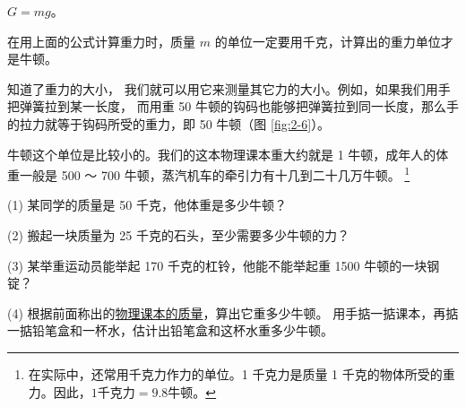 \centerline{$G = mg$。}

在用上面的公式计算重力时，质量 $m$ 的单位一定要用千克，计算出的重力单位才是牛顿。

知道了重力的大小， 我们就可以用它来测量其它力的大小。例如，如果我们用手把弹簧拉到某一长度，
而用重 50 牛顿的钩码也能够把弹簧拉到同一长度，那么手的拉力就等于钩码所受的重力，即 50 牛顿（图 \ref{fig:2-6}）。

牛顿这个单位是比较小的。我们的这本物理课本重大约就是 1 牛顿，成年人的体重一般是 500 ～ 700 牛顿，蒸汽机车的牵引力有十几到二十几万牛顿。
\footnote{在实际中，还常用千克力作力的单位。1 千克力是质量 1 千克的物体所受的重力。因此，$1 \text{千克力} =  9.8 \text{牛顿}$。}

\lianxi

(1) 某同学的质量是 50 千克，他体重是多少牛顿？

(2) 搬起一块质量为 25 千克的石头，至少需要多少牛顿的力？

(3) 某举重运动员能举起 170 千克的杠铃，他能不能举起重 1500 牛顿的一块钢锭？

(4) 根据前面称出的\hyperref[celiang-keben-zhiliang]{物理课本的质量}，算出它重多少牛顿。
用手掂一掂课本，再掂一掂铅笔盒和一杯水，估计出铅笔盒和这杯水重多少牛顿。



